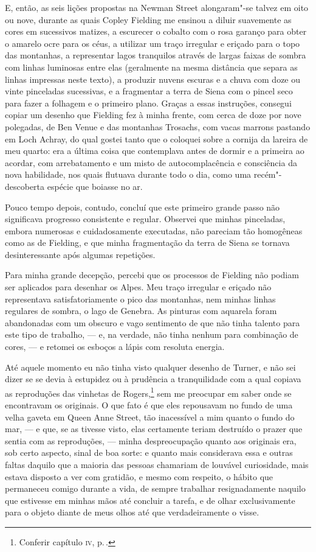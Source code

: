 \medskip

E, então, as seis lições propostas na Newman Street alongaram"-se
talvez em oito ou nove, durante as quais Copley Fielding me ensinou a
diluir suavemente as cores em sucessivos matizes, a escurecer o cobalto
com o rosa garanço para obter o amarelo ocre para os céus, a utilizar um
traço irregular e eriçado para o topo das montanhas, a representar lagos
tranquilos através de largas faixas de sombra com linhas luminosas entre
elas (geralmente na mesma distância que separa as linhas impressas neste
texto), a produzir nuvens escuras e a chuva com doze ou vinte pinceladas
sucessivas, e a fragmentar a terra de Siena com o pincel seco para fazer
a folhagem e o primeiro plano. Graças a essas instruções, consegui
copiar um desenho que Fielding fez à minha frente, com cerca de doze por
nove polegadas, de Ben Venue e das montanhas Trosachs, com vacas marrons
pastando em Loch Achray, do qual gostei tanto que o coloquei sobre a
cornija da lareira de meu quarto: era a última coisa que contemplava
antes de dormir e a primeira ao acordar, com arrebatamento e um misto de
autocomplacência e consciência da nova habilidade, nos quais flutuava
durante todo o dia, como uma recém"-descoberta espécie que boiasse no ar.

Pouco tempo depois, contudo, concluí que este primeiro grande passo não
significava progresso consistente e regular. Observei que minhas
pinceladas, embora numerosas e cuidadosamente executadas, não pareciam
tão homogêneas como as de Fielding, e que minha fragmentação da terra de
Siena se tornava desinteressante após algumas repetições.

Para minha grande decepção, percebi que os processos de Fielding não
podiam ser aplicados para desenhar os Alpes. Meu traço irregular e
eriçado não representava satisfatoriamente o pico das montanhas, nem
minhas linhas regulares de sombra, o lago de Genebra. As pinturas com
aquarela foram abandonadas com um obscuro e vago sentimento de que não
tinha talento para este tipo de trabalho, --- e, na verdade, não tinha
nenhum para combinação de cores, --- e retomei os esboços a lápis com
resoluta energia.

Até aquele momento eu não tinha visto qualquer desenho de Turner, e
não sei dizer se se devia à estupidez ou à prudência a tranquilidade com
a qual copiava as reproduções das vinhetas de Rogers,\footnote{Conferir
  capítulo \textsc{iv}, p.\,\pageref{87}.} sem me preocupar em saber onde se
encontravam os originais. O que fato é que eles repousavam no fundo de
uma velha gaveta em Queen Anne Street, tão inacessível a mim quanto o
fundo do mar, --- e que, se as tivesse visto, elas certamente teriam
destruído o prazer que sentia com as reproduções, --- minha
despreocupação quanto aos originais era, sob certo aspecto, sinal de boa
sorte: e quanto mais considerava essa e outras faltas daquilo que a
maioria das pessoas chamariam de louvável curiosidade, mais estava
disposto a ver com gratidão, e mesmo com respeito, o hábito que
permaneceu comigo durante a vida, de sempre trabalhar resignadamente
naquilo que estivesse em minhas mãos até concluir a tarefa, e de olhar
exclusivamente para o objeto diante de meus olhos até que
verdadeiramente o visse.

